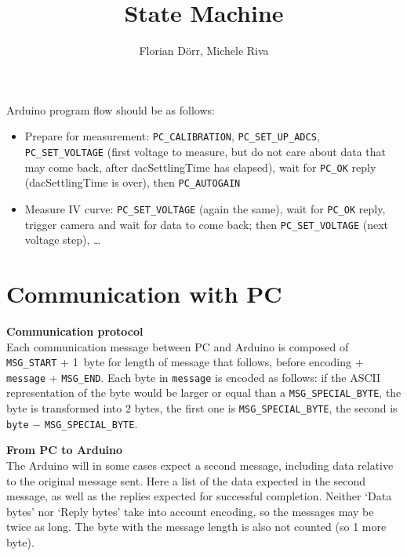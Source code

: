 \documentclass[11pt,a4paper,english]{article}
\author{Florian D\"orr, Michele Riva}
\title{State Machine}
\begin{document}
\titlepage

Arduino program flow should be as follows:
\begin{itemize}
\item Prepare for measurement: \texttt{PC\_CALIBRATION}, \texttt{PC\_SET\_UP\_ADCS}, \texttt{PC\_SET\_VOLTAGE} (first voltage to measure, but do not care about data that may come back, after dacSettlingTime has elapsed), wait for \texttt{PC\_OK} reply (dacSettlingTime is over), then \texttt{PC\_AUTOGAIN}
\item Measure IV curve: \texttt{PC\_SET\_VOLTAGE} (again the same), wait for \texttt{PC\_OK} reply, trigger camera and wait for data to come back; then \texttt{PC\_SET\_VOLTAGE} (next voltage step), \ldots
\end{itemize}

\section{Communication with PC}
\textbf{Communication protocol}\\Each communication message between PC and Arduino is composed of \texttt{MSG\_START} + 1~byte for length of message that follows, before encoding + \texttt{message} + \texttt{MSG\_END}. Each byte in \texttt{message} is encoded as follows: if the ASCII representation of the byte would be larger or equal than a \texttt{MSG\_SPECIAL\_BYTE}, the byte is transformed into 2 bytes, the first one is \texttt{MSG\_SPECIAL\_BYTE}, the second is \texttt{byte} $-$ \texttt{MSG\_SPECIAL\_BYTE}.

\vspace*{\baselineskip}
\noindent\textbf{From PC to Arduino}\\The Arduino will in some cases expect a second message, including data relative to the original message sent. Here a list of the data expected in the second message, as well as the replies expected for successful completion. Neither `Data bytes' nor `Reply bytes' take into account encoding, so the messages may be twice as long. The byte with the message length is also not counted (so 1 more byte).
\end{document}
